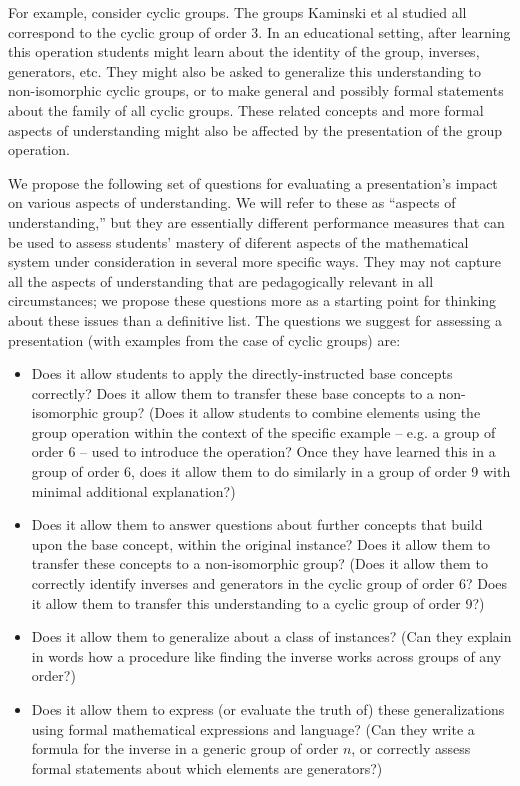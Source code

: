 \documentclass[man,10pt]{apa6}
\begin{document}
For example, consider cyclic groups. The groups Kaminski et al studied all correspond to the cyclic group of order 3. In an educational setting, after learning this operation students might learn about the identity of the group, inverses, generators, etc. They might also be asked to generalize this understanding to non-isomorphic cyclic groups, or to make general and possibly formal statements about the family of all cyclic groups. These related concepts and more formal aspects of understanding might also be affected by the presentation of the group operation. \par
We propose the following set of questions for evaluating a presentation's impact on various aspects of understanding. We will refer to these as ``aspects of understanding,'' but they are essentially different performance measures that can be used to assess students' mastery of diferent aspects of the mathematical system under consideration in several more specific ways. They may not capture all the aspects of understanding that are pedagogically relevant in all circumstances; we propose these questions more as a starting point for thinking about these issues than a definitive list. The questions we suggest for assessing a presentation (with examples from the case of cyclic groups) are:
\begin{itemize}
\item Does it allow students to apply the directly-instructed base concepts correctly? Does it allow them to transfer these base concepts to a non-isomorphic group? (Does it allow students to combine elements using the group operation within the context of the specific example -- e.g. a group of order 6 -- used to introduce the operation? Once they have learned this in a group of order 6, does it allow them to do similarly in a group of order 9 with minimal additional explanation?) 
\item Does it allow them to answer questions about further concepts that build upon the base concept, within the original instance? Does it allow them to transfer these concepts to a non-isomorphic group? (Does it allow them to correctly identify inverses and generators in the cyclic group of order 6? Does it allow them to transfer this understanding to a cyclic group of order 9?)
\item Does it allow them to generalize about a class of instances? (Can they explain in words how a procedure like finding the inverse works across groups of any order?) 
\item Does it allow them to express (or evaluate the truth of) these generalizations using formal mathematical expressions and language? (Can they write a formula for the inverse in a generic group of order $n$, or correctly assess formal statements about which elements are generators?)
\end{itemize}
\end{document}
